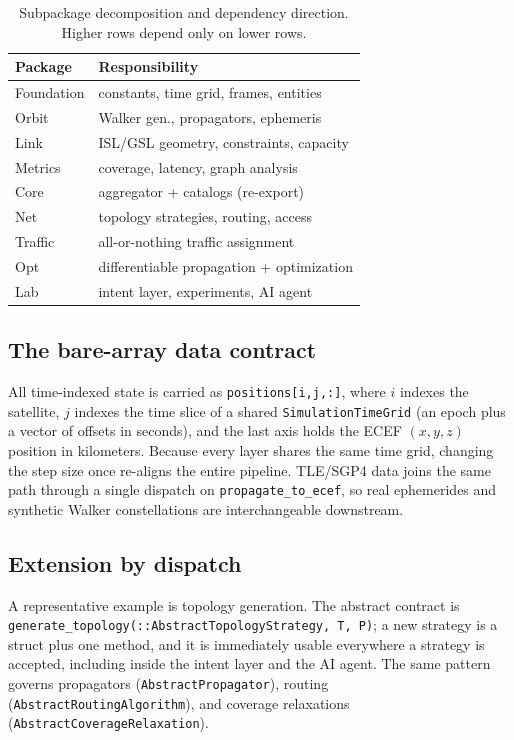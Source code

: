 \documentclass[10pt,twocolumn]{article}
\newcommand{\code}[1]{\texttt{\small #1}}
\begin{document}
\begin{table}[t]
\centering
\caption{Subpackage decomposition and dependency direction. Higher rows depend
only on lower rows.}
\label{tab:packages}
\small
\begin{tabular}{@{}ll@{}}
\toprule
\textbf{Package} & \textbf{Responsibility} \\
\midrule
Foundation & constants, time grid, frames, entities \\
Orbit      & Walker gen., propagators, ephemeris \\
Link       & ISL/GSL geometry, constraints, capacity \\
Metrics    & coverage, latency, graph analysis \\
Core       & aggregator + catalogs (re-export) \\
Net        & topology strategies, routing, access \\
Traffic    & all-or-nothing traffic assignment \\
Opt        & differentiable propagation + optimization \\
Lab        & intent layer, experiments, AI agent \\
\bottomrule
\end{tabular}
\end{table}

\subsection{The bare-array data contract}
All time-indexed state is carried as \code{positions[i,j,:]}, where $i$ indexes
the satellite, $j$ indexes the time slice of a shared
\code{SimulationTimeGrid} (an epoch plus a vector of offsets in seconds), and the
last axis holds the ECEF $(x,y,z)$ position in kilometers. Because every layer
shares the same time grid, changing the step size once re-aligns the entire
pipeline. TLE/SGP4 data joins the same path through a single dispatch on
\code{propagate\_to\_ecef}, so real ephemerides and synthetic Walker
constellations are interchangeable downstream.

\subsection{Extension by dispatch}
A representative example is topology generation. The abstract contract is
\code{generate\_topology(::AbstractTopologyStrategy, T, P)}; a new strategy is a
struct plus one method, and it is immediately usable everywhere a strategy is
accepted, including inside the intent layer and the AI agent. The same pattern
governs propagators (\code{AbstractPropagator}), routing
(\code{AbstractRoutingAlgorithm}), and coverage relaxations
(\code{AbstractCoverageRelaxation}).
\end{document}
